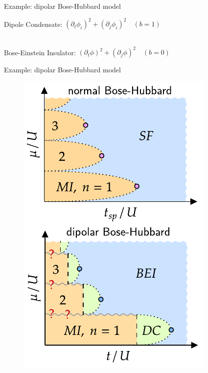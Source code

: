 \documentclass{beamer}
\begin{document}
\begin{frame}[t]{Example: dipolar Bose-Hubbard model}
\begin{figure}
\end{figure}
Dipole Condensate: \hspace{.2cm} $(\partial_t \phi_i)^2 + (\partial_j \phi_i)^2 \quad (b=1)$\\\

Bose-Einstein Insulator: $(\partial_t \phi)^2 + (\partial_j \phi)^2 \quad (b=0)$
\end{frame}

\begin{frame}[t]{Example: dipolar Bose-Hubbard model}
\begin{figure}
	\centering
	\includegraphics[scale=.8]{bhm}

\end{figure}
\end{frame}
\end{document}
